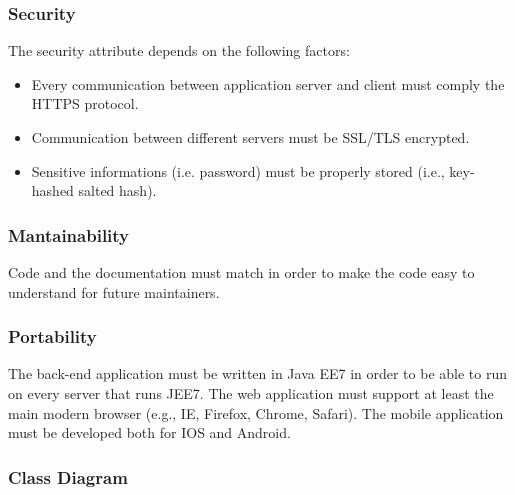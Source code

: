 \documentclass{article}
\begin{document}
	
	\subsubsection{Security}
	The security attribute depends on the following factors:
	\begin{itemize}
		\item Every communication between application server and client must comply the  HTTPS protocol.
		\item Communication between different servers must be SSL/TLS encrypted.
		\item Sensitive informations (i.e. password) must be properly stored (i.e., key-hashed salted hash).
	\end{itemize}
	
	
	\subsubsection{Mantainability}
	Code and the documentation must match in order to make the code easy to understand for future maintainers.
	
	
	\subsubsection{Portability}
	The back-end application must be written in Java EE7 in order to be able to run on every server that runs JEE7. The web application must support at least the main modern browser (e.g., IE, Firefox, Chrome, Safari). The mobile application must be developed both for IOS and Android.


	\newpage
	\subsubsection{Class Diagram} 
\end{document}
